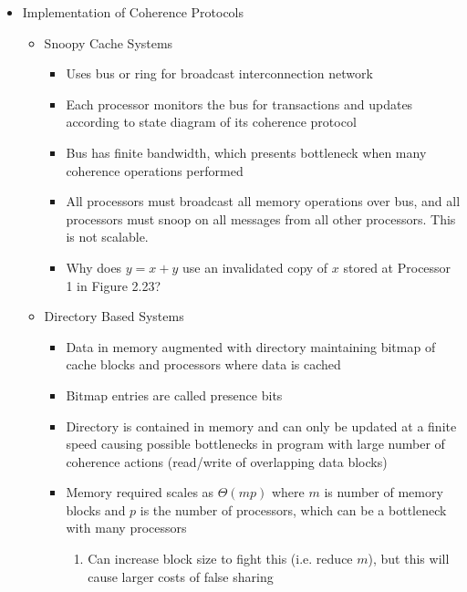\documentclass[a4paper]{article}
\begin{document}
\begin{itemize}
\begin{itemize}
\begin{itemize}
        \end{itemize}
      \item Implementation of Coherence Protocols
        \begin{itemize}
          \item Snoopy Cache Systems
            \begin{itemize}
              \item Uses bus or ring for broadcast interconnection network
              \item Each processor monitors the bus for transactions and updates according to state diagram of its coherence protocol
              \item Bus has finite bandwidth, which presents bottleneck when many coherence operations performed
              \item All processors must broadcast all memory operations over bus, and all processors must snoop on all messages from all other
                processors. This is not scalable.
              \item \color{red} Why does $y=x+y$ use an invalidated copy of $x$ stored at Processor 1 in Figure 2.23?
            \end{itemize}
          \item Directory Based Systems
            \begin{itemize}
              \item Data in memory augmented with directory maintaining bitmap of cache blocks and processors where data is cached
              \item Bitmap entries are called presence bits
              \item Directory is contained in memory and can only be updated at a finite speed causing possible bottlenecks in program with large
                number of coherence actions (read/write of overlapping data blocks)
              \item Memory required scales as $\Theta(mp)$ where $m$ is number of memory blocks and $p$ is the number of processors, which can be a
                bottleneck with many processors
                \begin{enumerate}
                  \item Can increase block size to fight this (i.e. reduce $m$), but this will cause larger costs of false sharing
                \end{enumerate}
            \end{itemize}
        \end{itemize}
    \end{itemize}
\end{itemize}
\end{document}
